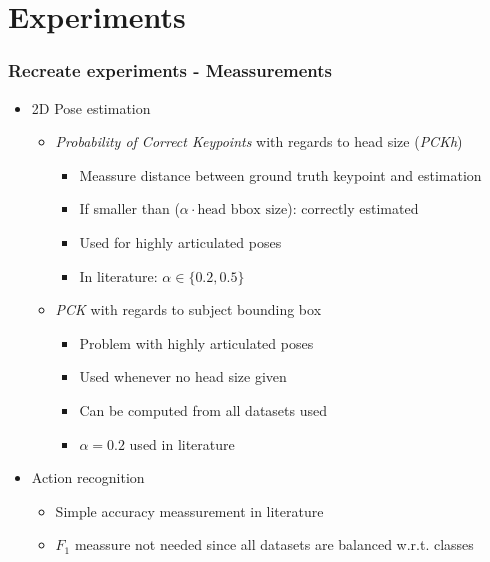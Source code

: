 \documentclass[9pt]{beamer}
\newenvironment{myframe}[1][]{%
\begin{frame}%
\frametitle{#1}
\setcounter{footnote}{0}


}{%
\end{frame}%
}
\begin{document}
\section{Experiments}
\begin{myframe}[Recreate experiments - Meassurements]
    \begin{itemize}
        \item 2D Pose estimation
        \begin{itemize}
            \item \textit{Probability of Correct Keypoints} with regards to head size (\textit{PCKh})
            \begin{itemize}
                \item Meassure distance between ground truth keypoint and estimation
                \item If smaller than ($\alpha \cdot \text{head bbox size}$): correctly estimated
                \item Used for highly articulated poses
                \item In literature: $\alpha \in \{0.2, 0.5\}$
            \end{itemize}    
            \item \textit{PCK} with regards to subject bounding box
            \begin{itemize}
                \item Problem with highly articulated poses
                \item Used whenever no head size given
                \item Can be computed from all datasets used
                \item $\alpha = 0.2$ used in literature
            \end{itemize}
        \end{itemize}
        \item Action recognition
        \begin{itemize}
            \item Simple accuracy meassurement in literature
            \item $F_1$ meassure not needed since all datasets are balanced w.r.t. classes
        \end{itemize}
    \end{itemize}
\end{myframe}
\end{document}
